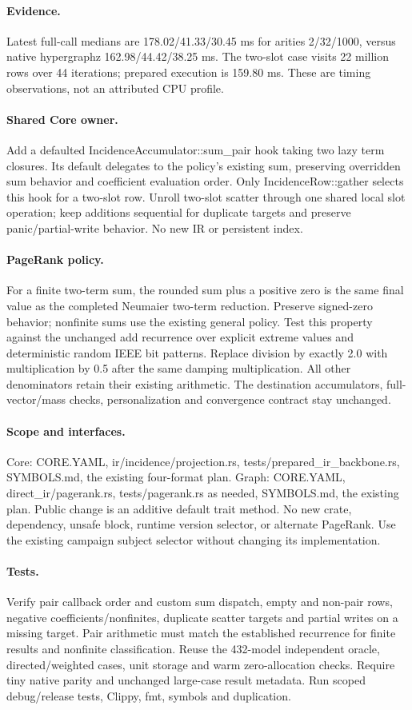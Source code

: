 \documentclass[11pt,a4paper]{article}
\begin{document}
\paragraph{Evidence.} Latest full-call medians are 178.02/41.33/30.45 ms for
arities 2/32/1000, versus native hypergraphz 162.98/44.42/38.25 ms. The two-slot
case visits 22 million rows over 44 iterations; prepared execution is 159.80 ms.
These are timing observations, not an attributed CPU profile.
\paragraph{Shared Core owner.} Add a defaulted IncidenceAccumulator::sum\_pair
hook taking two lazy term closures. Its default delegates to the policy's existing
sum, preserving overridden sum behavior and coefficient evaluation order. Only
IncidenceRow::gather selects this hook for a two-slot row. Unroll two-slot scatter
through one shared local slot operation; keep additions sequential for duplicate
targets and preserve panic/partial-write behavior. No new IR or persistent index.
\paragraph{PageRank policy.} For a finite two-term sum, the rounded sum plus a
positive zero is the same final value as the completed Neumaier two-term reduction.
Preserve signed-zero behavior; nonfinite sums use the existing general policy.
Test this property against the unchanged add recurrence over explicit extreme
values and deterministic random IEEE bit patterns. Replace division by exactly
2.0 with multiplication by 0.5 after the same damping multiplication. All other
denominators retain their existing arithmetic. The destination accumulators,
full-vector/mass checks, personalization and convergence contract stay unchanged.
\paragraph{Scope and interfaces.} Core: CORE.YAML, ir/incidence/projection.rs,
tests/prepared\_ir\_backbone.rs, SYMBOLS.md, the existing four-format plan.
Graph: CORE.YAML, direct\_ir/pagerank.rs, tests/pagerank.rs as needed, SYMBOLS.md,
the existing plan. Public change is an additive default trait method. No new
crate, dependency, unsafe block, runtime version selector, or alternate PageRank.
Use the existing campaign subject selector without changing its implementation.
\paragraph{Tests.} Verify pair callback order and custom sum dispatch, empty and
non-pair rows, negative coefficients/nonfinites, duplicate scatter targets and
partial writes on a missing target. Pair arithmetic must match the established
recurrence for finite results and nonfinite classification. Reuse the 432-model
independent oracle, directed/weighted cases, unit storage and warm zero-allocation
checks. Require tiny native parity and unchanged large-case result metadata.
Run scoped debug/release tests, Clippy, fmt, symbols and duplication.
\end{document}
